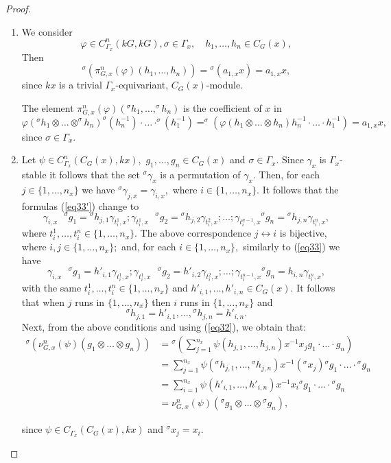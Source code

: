\documentclass[pdflatex,sn-mathphys-num]{sn-jnl}
\numberwithin{equation}{section}
\theoremstyle{thmstyleone}
\theoremstyle{thmstyletwo}
\theoremstyle{thmstylethree}
\begin{document}
\begin{proof}

\begin{enumerate}
\item[i).] We consider $$\varphi\in C_{\Gamma_x}^n(kG,kG),\sigma\in \Gamma_x,\quad h_1,\ldots,h_n\in C_G(x),$$
Then $${}^{\sigma}(\pi_{G,x}^n(\varphi)(h_1,\ldots,h_n))={}^{\sigma}(a_{1,x}x)=a_{1,x}x,$$
since  $kx$ is a trivial $\Gamma_x$-equivariant, $C_G(x)$-module.

The element $\pi_{G,x}^n(\varphi)(^{\sigma}h_1,\dots,^{\sigma}h_n)$ is the coefficient of $x$ in $$\varphi(^{\sigma}h_1\otimes\dots \otimes^{\sigma}h_n)^{\sigma}(h_n^{-1})\cdot \dots \cdot ^{\sigma}(h_1^{-1})=^{\sigma}(\varphi(h_1\otimes\dots \otimes h_n)h_n^{-1}\cdot \dots \cdot h_1^{-1})=a_{1,x}x,$$ since $\sigma\in \Gamma_x.$

\item[ii).] Let $\psi \in C_{\Gamma_x}^n(C_G(x),kx),$ $g_1,\dots,g_n\in C_G(x)$ and $\sigma \in \Gamma_x.$ Since $\gamma_x$ is $\Gamma_x$-stable it follows that the set ${}^\sigma\gamma_x$ is a permutation of $\gamma_x.$ Then, for each $j\in\{1,\ldots, n_x\}$ we have ${}^{\sigma}\gamma_{j,x}=\gamma_{i,x},$ where $i\in\{1,\ldots,n_x\}.$ It follows that the formulas (\ref{eq33'}) change to
$$\gamma_{i,x}\mbox{ }^{\sigma}g_1={}^{\sigma}h_{j,1}\gamma_{t_i^1,x}; \gamma_{t_i^1,x}\mbox{ }^{\sigma}g_2=
    {}^{\sigma}h_{j,2}\gamma_{t_i^2,x};
    \dots;\gamma_{t_i^{n-1},x}{ }^{\sigma}g_n={}^{\sigma}h_{j,n}\gamma_{t_i^n,x},$$
 where $t_i^1,\ldots,t_i^n\in\{1,\ldots,n_x\}.$
 The above correspondence $j\leftrightarrow i$ is bijective, where $i,j\in\{1,\ldots,n_x\};$  and, for each $i\in\{1,\ldots,n_x\},$ similarly to (\ref{eq33})  we have
 $$\gamma_{i,x}\mbox{ }^{\sigma}g_1=h'_{i,1}\gamma_{t_i^1,x}; \gamma_{t_i^1,x}\mbox{ }^{\sigma}g_2=
    h'_{i,2}\gamma_{t_i^2,x};
    \dots;\gamma_{t_i^{n-1},x}{ }^{\sigma}g_n=h_{i,n}\gamma_{t_i^n,x},$$
with the same $t_i^1,\ldots,t_i^n\in\{1,\ldots,n_x\}$ and $h'_{i,1},\ldots, h'_{i,n}\in C_G(x).$ It follows that when $j$ runs in $\{1,\ldots,n_x\}$ then $i$ runs in $\{1,\ldots,n_x\}$ and
$${}^{\sigma}h_{j,1}=h'_{i,1}, \ldots, {}^{\sigma}h_{j,n}=h'_{i,n}.$$
Next, from the above conditions and using (\ref{eq32}), we obtain that:
\begin{align*}
{}^{\sigma}(\nu_{G,x}^n(\psi)(g_1\otimes \dots \otimes g_n))&={}^{\sigma}\left(\sum_{j=1}^{n_x}\psi(h_{j,1},\dots,h_{j,n})x^{-1} x_j g_1 \cdot \dots \cdot g_n\right)\\
&=\sum_{j=1}^{n_x}\psi({}^{\sigma}h_{j,1},\dots,{}^{\sigma}h_{j,n})x^{-1}({}^{\sigma} x_j)  { }^{\sigma} g_1 \cdot \dots \cdot {}^{\sigma}g_n\\
     &=\sum_{i=1}^{n_x}\psi(h'_{i,1},\dots,h'_{i,n})x^{-1} x_i { }^{\sigma} g_1 \cdot \dots \cdot {}^{\sigma}g_n\\
     &=\nu_{G,x}^n(\psi)({}^{\sigma}g_1\otimes \dots \otimes {}^{\sigma} g_n),
 \end{align*}

since $\psi \in C_{\Gamma_x}(C_G(x),kx)$ and ${}^{\sigma}x_j=x_i.$
\end{enumerate}

\end{proof}
\end{document}

